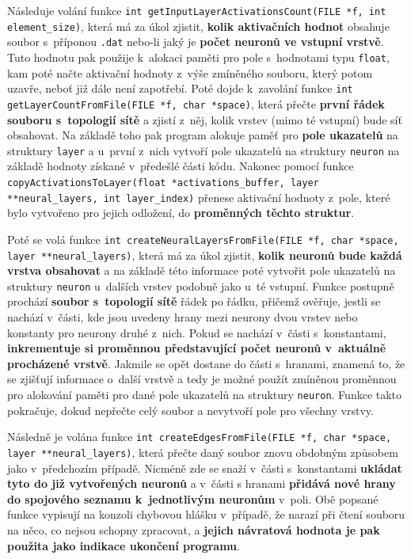\documentclass[11pt]{article}
\begin{document}
Následuje volání funkce \texttt{int getInputLayerActivationsCount(FILE *f, int element\_size)}, která má za úkol zjistit, \textbf{kolik aktivačních hodnot} obsahuje soubor s~příponou \texttt{.dat} nebo-li jaký je \textbf{počet neuronů ve vstupní vrstvě}. Tuto hodnotu pak použije k~alokaci paměti pro pole s~hodnotami typu \texttt{float}, kam poté načte aktivační hodnoty z~výše zmíněného souboru, který potom uzavře, neboť již dále není zapotřebí. Poté dojde k~zavolání funkce \texttt{int getLayerCountFromFile(FILE *f, char *space)}, která přečte \textbf{první řádek souboru s~topologií sítě} a zjistí z~něj, kolik vrstev (mimo té vstupní) bude síť obsahovat. Na základě toho pak program alokuje paměť pro \textbf{pole ukazatelů} na struktury \texttt{layer} a u~první z~nich vytvoří pole ukazatelů na struktury \texttt{neuron} na základě hodnoty získané v~předešlé části kódu. Nakonec pomocí funkce \texttt{copyActivationsToLayer(float *activations\_buffer, layer **neural\_layers, int layer\_index)} přenese aktivační hodnoty z~pole, které bylo vytvořeno pro jejich odložení, do \textbf{proměnných těchto struktur}.

Poté se volá funkce \texttt{int createNeuralLayersFromFile(FILE *f, char *space, layer **neural\_layers)}, která má za úkol zjistit, \textbf{kolik neuronů bude každá vrstva obsahovat} a na základě této informace poté vytvořit pole ukazatelů na struktury \texttt{neuron} u~dalších vrstev podobně jako u~té vstupní. Funkce postupně prochází \textbf{soubor s~topologií sítě} řádek po řádku, přičemž ověřuje, jestli se nachází v~části, kde jsou uvedeny hrany mezi neurony dvou vrstev nebo konstanty pro neurony druhé z~nich. Pokud se nachází v~části s~konstantami, \textbf{inkrementuje si proměnnou představující počet neuronů v~aktuálně procházené vrstvě}. Jakmile se opět dostane do části s~hranami, znamená to, že se zjišťují informace o~další vrstvě a tedy je možné použít zmíněnou proměnnou pro alokování paměti pro dané pole ukazatelů na struktury \texttt{neuron}. Funkce takto pokračuje, dokud nepřečte celý soubor a nevytvoří pole pro všechny vrstvy.

Následně je volána funkce \texttt{int createEdgesFromFile(FILE *f, char *space, layer **neural\_layers)}, která přečte daný soubor znovu obdobným způsobem jako v~předchozím případě. Nicméně zde se snaží v~části s~konstantami \textbf{ukládat tyto do již vytvořených neuronů} a v~části s hranami \textbf{přidává nové hrany do spojového seznamu k~jednotlivým neuronům} v~poli. Obě popsané funkce vypisují na konzoli chybovou hlášku v~případě, že narazí při čtení souboru na něco, co nejsou schopny zpracovat, a \textbf{jejich návratová hodnota je pak použita jako indikace ukončení programu}.
\end{document}
